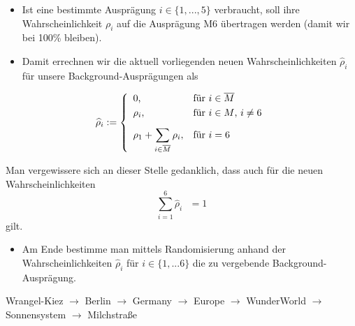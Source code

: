 \begin{Algo}
\begin{itemize}
    \item Ist eine bestimmte Ausprägung $i \in \lbrace 1,...,5 \rbrace$ verbraucht, soll ihre Wahrscheinlichkeit $\rho_i$ auf die Ausprägung M6 übertragen werden (damit wir bei 100\% bleiben).

    \item Damit errechnen wir die aktuell vorliegenden neuen Wahrscheinlichkeiten $\widehat{\rho}_i$ für unsere Background-Ausprägungen als
\end{itemize} 

\[
\widehat{\rho}_i:=\left\{%
\begin{array}{ll}
	\hbox{0,} & \hbox{für $i \in \overline{M}$} \\[0,1cm] 
    \hbox{$\rho_i$,} & \hbox{für $i \in M$, $i \neq 6$} \\[0,3cm]
    \displaystyle \rho_1 + \sum_{i \in \overline{M}} \rho_i, & \hbox{für $i = 6$} \\
\end{array}%
\right.
\]

Man vergewissere sich an dieser Stelle gedanklich, dass auch für die neuen \newline Wahrscheinlichkeiten \[\sum_{i = 1}^6 \widehat{\rho}_i \textrm{ } = 1\] gilt.

\begin{itemize}
    \item Am Ende bestimme man mittels Randomisierung anhand der Wahrscheinlichkeiten $\widehat{\rho}_i$ für $i \in \lbrace 1,...6 \rbrace$ die zu vergebende Background-Ausprägung. 
\end{itemize}

\end{Algo}



\vspace{0.5cm}

\begin{NFT-Prop}[Edition]


\vspace{0.2cm}

Wrangel-Kiez $\rightarrow$ Berlin $\rightarrow$ Germany $\rightarrow$ Europe $\rightarrow$ WunderWorld $\rightarrow$ Sonnensystem $\rightarrow$ Milchstraße

\end{NFT-Prop}



\vspace{0.5cm}

